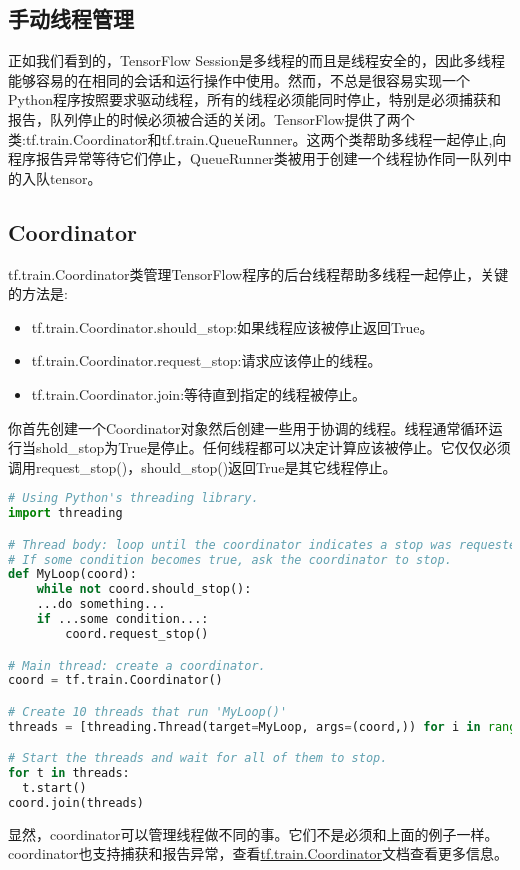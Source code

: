 \subsection{手动线程管理}
正如我们看到的，TensorFlow Session是多线程的而且是线程安全的，因此多线程能够容易的在相同的会话和运行操作中使用。然而，不总是很容易实现一个Python程序按照要求驱动线程，所有的线程必须能同时停止，特别是必须捕获和报告，队列停止的时候必须被合适的关闭。TensorFlow提供了两个类:tf.train.Coordinator和tf.train.QueueRunner。这两个类帮助多线程一起停止,向程序报告异常等待它们停止，QueueRunner类被用于创建一个线程协作同一队列中的入队tensor。
\subsection{Coordinator}
tf.train.Coordinator类管理TensorFlow程序的后台线程帮助多线程一起停止，关键的方法是:
\begin{itemize}
	\item tf.train.Coordinator.should\_stop:如果线程应该被停止返回True。
	\item tf.train.Coordinator.request\_stop:请求应该停止的线程。
	\item tf.train.Coordinator.join:等待直到指定的线程被停止。
\end{itemize}
你首先创建一个Coordinator对象然后创建一些用于协调的线程。线程通常循环运行当shold\_stop为True是停止。任何线程都可以决定计算应该被停止。它仅仅必须调用request\_stop()，should\_stop()返回True是其它线程停止。
\begin{lstlisting}[language=Python]
# Using Python's threading library.
import threading

# Thread body: loop until the coordinator indicates a stop was requested.
# If some condition becomes true, ask the coordinator to stop.
def MyLoop(coord):
    while not coord.should_stop():
    ...do something...
    if ...some condition...:
        coord.request_stop()

# Main thread: create a coordinator.
coord = tf.train.Coordinator()

# Create 10 threads that run 'MyLoop()'
threads = [threading.Thread(target=MyLoop, args=(coord,)) for i in range(10)]

# Start the threads and wait for all of them to stop.
for t in threads:
  t.start()
coord.join(threads)
\end{lstlisting}
显然，coordinator可以管理线程做不同的事。它们不是必须和上面的例子一样。coordinator也支持捕获和报告异常，查看\href{https://www.tensorflow.org/api_docs/python/tf/train/Coordinator}{tf.train.Coordinator}文档查看更多信息。
